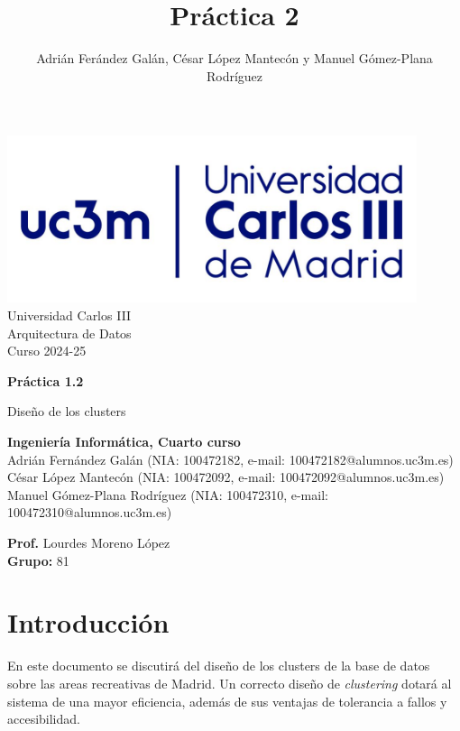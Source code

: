 \documentclass[]{article}
\title{Práctica 2}
\author{Adrián Ferández Galán, César López Mantecón y Manuel Gómez-Plana Rodríguez}
\begin{document}
\begin{titlepage}
    \centering
   \includegraphics[width=0.9\textwidth]{uc3m.jpg} 
    {\Huge Universidad Carlos III\\
    
     \Large Arquitectura de Datos\\
     \vspace{0.5cm}
     Curso 2024-25}
    \vspace{2cm}

    {\Huge \textbf{Práctica 1.2} \par}
    \vspace{0.5cm}
    {\Large Diseño de los clusters \par}
    \vspace{8cm}

   \textbf{Ingeniería Informática, Cuarto curso}\\
    \vspace{0.2cm} 
    Adrián Fernández Galán       (NIA: 100472182, e-mail: 100472182@alumnos.uc3m.es)\\
    César López Mantecón         (NIA: 100472092, e-mail: 100472092@alumnos.uc3m.es)\\
    Manuel Gómez-Plana Rodríguez (NIA: 100472310, e-mail: 100472310@alumnos.uc3m.es)
    \vspace{0.5cm}

   
    \textbf{Prof.} Lourdes Moreno López\\
    
    \textbf{Grupo: } 81   
    
\end{titlepage}
\newpage

\renewcommand{\contentsname}{\centering Índice}
\tableofcontents

\newpage
\section{Introducción}
\label{sec:introduccion}
En este documento se discutirá del diseño de los clusters de la base de datos sobre las areas recreativas de Madrid. Un correcto diseño de \textit{clustering} dotará al sistema de una mayor eficiencia, además de sus ventajas de tolerancia a fallos y accesibilidad. 
\end{document}

